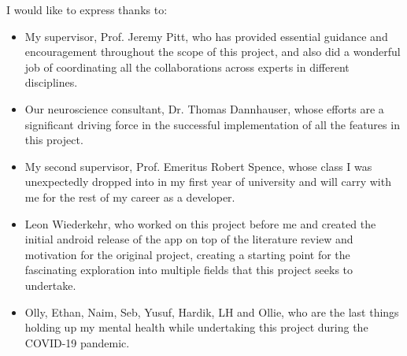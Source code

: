 \cleardoublepage

\begin{acknowledgements}

I would like to express thanks to:

\begin{itemize}
 \item My supervisor, Prof. Jeremy Pitt, who has provided essential guidance and encouragement throughout the scope of this project, and also did a wonderful job of coordinating all the collaborations across experts in different disciplines.
 \vspace*{3mm}
 \item Our neuroscience consultant, Dr. Thomas Dannhauser, whose efforts are a significant driving force in the successful implementation of all the features in this project.
 \item My second supervisor, Prof. Emeritus Robert Spence, whose class I was unexpectedly dropped into in my first year of university and will carry with me for the rest of my career as a developer.
 \vspace*{3mm}
 \item Leon Wiederkehr, who worked on this project before me and created the initial android release of the app on top of the literature review and motivation for the original project, creating a starting point for the fascinating exploration into multiple fields that this project seeks to undertake.
 \vspace*{3mm}
 \item Olly, Ethan, Naim, Seb, Yusuf, Hardik, LH and Ollie, who are the last things holding up my mental health while undertaking this project during the COVID-19 pandemic.
\end{itemize}

\end{acknowledgements}